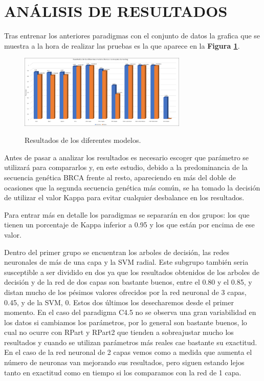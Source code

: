 \documentclass[10pt,twocolumn,letterpaper,a4paper]{article}
\begin{document}
\section{ANÁLISIS DE RESULTADOS}

Tras entrenar los anteriores paradigmas con el conjunto de datos la grafica que se muestra a la hora de realizar las pruebas es la que aparece en la \textbf{Figura \ref{figura_1}}.

\begin{figure}[!htbp] 
  \centering 
  \includegraphics[width=8cm]{Resultados.jpg}\\ 
  \caption{Resultados de los diferentes modelos.}
  \label{figura_1} 
\end{figure} 

Antes de pasar a analizar los resultados es necesario escoger que parámetro se utilizará para compararlos y, en este estudio, debido a la predominancia de la secuencia genética BRCA frente al resto, apareciendo en más del doble de ocasiones que la segunda secuencia genética más común, se ha tomado la decisión de utilizar el valor Kappa para evitar cualquier desbalance en los resultados.

Para entrar más en detalle los paradigmas se separarán en dos grupos: los que tienen un porcentaje de Kappa inferior a 0.95 y los que están por encima de ese valor.

Dentro del primer grupo se encuentran los arboles de decisión, las redes neuronales de más de una capa y la SVM radial. Este subgrupo también seria susceptible a ser dividido en dos ya que los resultados obtenidos de los arboles de decisión y de la red de dos capas son bastante buenos, entre el 0.80 y el 0.85, y distan mucho de los pésimos valores ofrecidos por la red neuronal de 3 capas, 0.45, y de la SVM, 0. Estos dos últimos los desecharemos desde el primer momento. En el caso del paradigma C4.5 no se observa una gran variabilidad en los datos si cambiamos los parámetros, por lo general son bastante buenos, lo cual no ocurre con RPart y RPart2 que tienden a sobreajustar mucho los resultados y cuando se utilizan parámetros más reales cae bastante su exactitud. En el caso de la red neuronal de 2 capas vemos como a medida que aumenta el número de neuronas van mejorando sus resultados, pero siguen estando lejos tanto en exactitud como en tiempo si los comparamos con la red de 1 capa.
\end{document}
